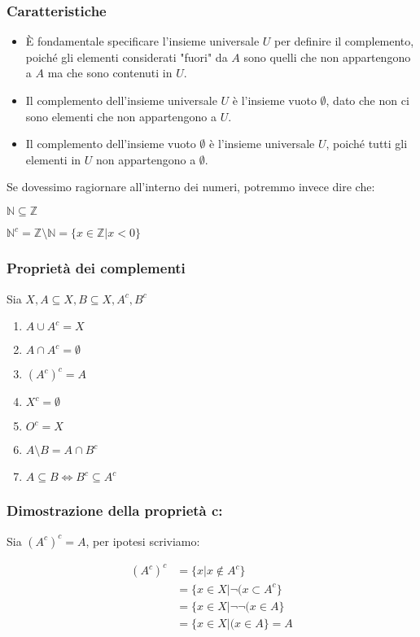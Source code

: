 \documentclass[article,12pt]{book}
\begin{document}
\begin{enumerate}
\subsubsection{Caratteristiche}
\begin{itemize}
    \item  È fondamentale specificare l'insieme universale $U$ per definire il complemento, poiché gli elementi considerati "fuori" da $A$ sono quelli che non appartengono a $A$ ma che sono contenuti in $U$.
    \item Il complemento dell'insieme universale $U$ è l'insieme vuoto $\emptyset$, dato che non ci sono elementi che non appartengono a $U$.
    \item  Il complemento dell'insieme vuoto $\emptyset$ è l'insieme universale $U$, poiché tutti gli elementi in $U$ non appartengono a $\emptyset$.
\end{itemize}

Se dovessimo ragiornare all'interno dei numeri, potremmo invece dire che:
\begin{center}
    $\mathbb{N} \subseteq \mathbb{Z}$
\end{center}
\begin{center}
    $\mathbb{N}^c = \mathbb{Z} \setminus \mathbb{N} =\{x \in \mathbb{Z}|x < 0\}$
\end{center}

\newpage


\subsubsection{Proprietà dei complementi}
Sia $X, A \subseteq X, B \subseteq X, A^c, B^c$ \\
    \begin{enumerate}
        \item $A \cup A^c = X$
        \item $A \cap A^c = \emptyset$
        \item $(A^c)^c = A$
        \item $X^c = \emptyset$
        \item $O^c = X$
        \item $A \setminus B = A \cap B^c$
        \item $A \subseteq B \iff B^c \subseteq A^c$
    \end{enumerate}

\subsubsection{Dimostrazione della proprietà c:}
Sia $(A^c)^c = A$, per ipotesi scriviamo: \label{dimostrazione con de morgan}
    \begin{center}
            \begin{align*}
                (A^c)^c &= \{x|x \notin A^c\}\\
                        &= \{x \in X | \neg (x \subset A^c\} \\
                        &= \{x \in X | \neg\neg (x \in A\} \\
                        &= \{x \in X | (x \in A \} = A
            \end{align*}
        

\end{center}
\end{enumerate}
\end{document}

